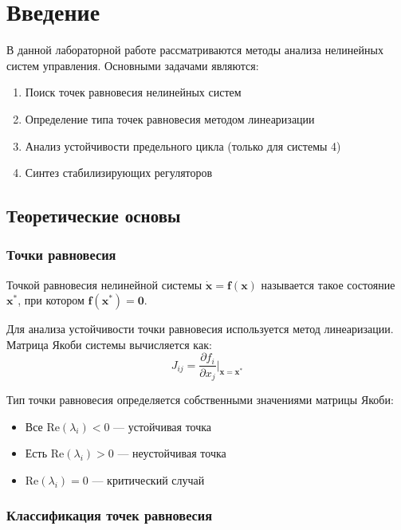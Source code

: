 \section*{Введение}

В данной лабораторной работе рассматриваются методы анализа нелинейных систем управления. Основными задачами являются:

\begin{enumerate}
\item Поиск точек равновесия нелинейных систем
\item Определение типа точек равновесия методом линеаризации
\item Анализ устойчивости предельного цикла (только для системы 4)
\item Синтез стабилизирующих регуляторов
\end{enumerate}

\subsection*{Теоретические основы}

\subsubsection*{Точки равновесия}

Точкой равновесия нелинейной системы $\dot{\mathbf{x}} = \mathbf{f}(\mathbf{x})$ называется такое состояние $\mathbf{x}^*$, при котором $\mathbf{f}(\mathbf{x}^*) = \mathbf{0}$.

Для анализа устойчивости точки равновесия используется метод линеаризации. Матрица Якоби системы вычисляется как:
$$J_{ij} = \frac{\partial f_i}{\partial x_j}\bigg|_{\mathbf{x} = \mathbf{x}^*}$$

Тип точки равновесия определяется собственными значениями матрицы Якоби:
\begin{itemize}
\item Все $\text{Re}(\lambda_i) < 0$ --- устойчивая точка
\item Есть $\text{Re}(\lambda_i) > 0$ --- неустойчивая точка
\item $\text{Re}(\lambda_i) = 0$ --- критический случай
\end{itemize}

\subsubsection*{Классификация точек равновесия}

